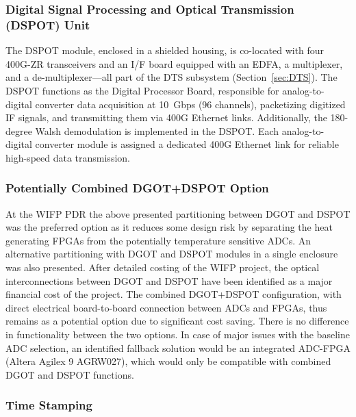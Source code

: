 \subsubsection{Digital Signal Processing and Optical Transmission (DSPOT) Unit}

The \ac{DSPOT} module, enclosed in a shielded housing, is co-located with four 400G-ZR transceivers and an \ac{I/F} board equipped with an \ac{EDFA}, a multiplexer, and a de-multiplexer—all part of the \ac{DTS} subsystem (Section~\ref{sec:DTS}).
The \ac{DSPOT} functions as the Digital Processor Board, responsible for analog-to-digital converter data acquisition at 10~Gbps (96 channels), packetizing digitized \ac{IF} signals, and transmitting them via 400G Ethernet links.
Additionally, the 180-degree Walsh demodulation is implemented in the \ac{DSPOT}.
Each analog-to-digital converter module is assigned a dedicated 400G Ethernet link for reliable high-speed data transmission.

\subsubsection{Potentially Combined DGOT+DSPOT Option}

At the WIFP PDR the above presented partitioning between DGOT and DSPOT was the preferred option as it reduces some design risk by separating the heat generating FPGAs from the potentially temperature sensitive ADCs. An alternative partitioning with DGOT and DSPOT modules in a single enclosure was also presented. After detailed costing of the WIFP project, the optical interconnections between DGOT and DSPOT have been identified as a major financial cost of the project. The combined DGOT+DSPOT configuration, with direct electrical board-to-board connection between ADCs and FPGAs, thus remains as a potential option due to significant cost saving. There is no difference in functionality between the two options. In case of major issues with the baseline ADC selection, an identified fallback solution would be an integrated ADC-FPGA (Altera Agilex 9 AGRW027), which would only be compatible with combined DGOT and DSPOT functions.


\subsubsection{Time Stamping}
\label{sec:TimeStamping}

